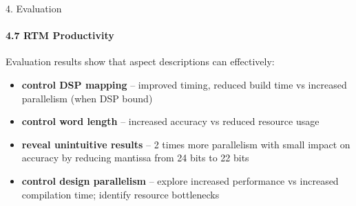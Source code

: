 \begin{frame}{4. Evaluation}
  \framesubtitle{4.7 RTM Productivity}
  Evaluation results show that aspect descriptions can effectively:
  \begin{itemize}
    \setlength{\itemsep}{10pt}
  \item \textbf{control DSP mapping} -- improved timing, reduced build time vs
    increased parallelism (when DSP bound)
  \item \textbf{control word length} -- increased accuracy vs reduced
    resource usage
  \item \textbf{reveal unintuitive results} -- 2 times more
    parallelism with small impact on accuracy by reducing mantissa
    from 24 bits to 22 bits
  \item \textbf{control design parallelism} -- explore increased
    performance vs increased compilation time; identify resource
    bottlenecks
  \end{itemize}
\end{frame}

\begin{comment}
  \begin{frame}{4. Evaluation: Reverse Time Migration}
    \begin{table}
    \end{table}
  \end{frame}
\end{comment}

